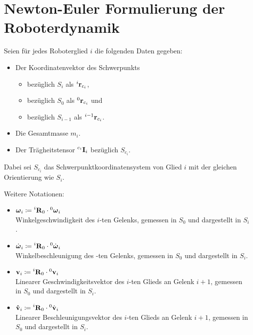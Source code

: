 	\section{Newton-Euler Formulierung der Roboterdynamik} %
		Seien für jedes Roboterglied \(i\) die folgenden Daten gegeben:
		\begin{itemize}
			\item Der Koordinatenvektor des Schwerpunkts
				\begin{itemize}
					\item bezüglich \(S_i\) als \( \prescript{i}{}{\boldsymbol{\mathrm{r}}}_{c_i} \),
					\item bezüglich \(S_0\) als \( \prescript{0}{}{\boldsymbol{\mathrm{r}}}_{c_i} \) und
					\item bezüglich \(S_{i - 1}\) als \( \prescript{i - 1}{}{\boldsymbol{\mathrm{r}}}_{c_i} \).
				\end{itemize}
			\item Die Gesamtmasse \(m_i\).
			\item Der Trägheitstensor \( \prescript{c_i}{}{\boldsymbol{\mathrm{I}}}_i \) bezüglich \( S_{c_i} \).
		\end{itemize}
		Dabei sei \( S_{c_i} \) das Schwerpunktkoordinatensystem von Glied \(i\) mit der gleichen Orientierung wie \( S_i \).
		
		Weitere Notationen:
		\begin{itemize}
			\item \( \boldsymbol{\mathrm{\omega}}_i \coloneqq \prescript{i}{}{\boldsymbol{\mathrm{R}}}_0 \cdot \prescript{0}{}{\boldsymbol{\mathrm{\omega}}}_i \) \\
					Winkelgeschwindigkeit des \(i\)-ten Gelenks, gemessen in \(S_0\) und dargestellt in \(S_i\).
			\item \( \dot{\boldsymbol{\mathrm{\omega}}}_i \coloneqq \prescript{i}{}{\boldsymbol{\mathrm{R}}}_0 \cdot \prescript{0}{}{\dot{\boldsymbol{\mathrm{\omega}}}}_i \) \\
					Winkelbeschleunigung des \(\)-ten Gelenks, gemessen in \(S_0\) und dargestellt in \(S_i\).
			\item \( \boldsymbol{\mathrm{v}}_i \coloneqq \prescript{i}{}{\boldsymbol{\mathrm{R}}}_0 \cdot \prescript{0}{}{\boldsymbol{\mathrm{v}}}_i \) \\
					Linearer Geschwindigkeitsvektor des \(i\)-ten Glieds an Gelenk \(i + 1\), gemessen in \(S_0\) und dargestellt in \(S_i\).
			\item \( \boldsymbol{\mathrm{\dot{v}}}_i \coloneqq \prescript{i}{}{\boldsymbol{\mathrm{R}}}_0 \cdot \prescript{0}{}{\dot{\boldsymbol{\mathrm{v}}}}_i \) \\
					Linearer Beschleunigungsvektor des \(i\)-ten Glieds an Gelenk \(i + 1\), gemessen in \(S_0\) und dargestellt in \(S_i\).
		\end{itemize}

